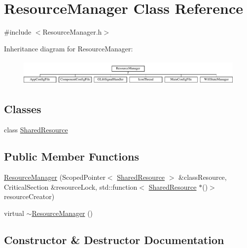 \hypertarget{classResourceManager}{}\section{Resource\+Manager Class Reference}
\label{classResourceManager}


{\ttfamily \#include $<$Resource\+Manager.\+h$>$}

Inheritance diagram for Resource\+Manager\+:\begin{figure}[H]
\begin{center}
\leavevmode
\includegraphics[height=1.323877cm]{classResourceManager}
\end{center}
\end{figure}
\subsection*{Classes}
\begin{DoxyCompactItemize}
\item 
class \mbox{\hyperlink{classResourceManager_1_1SharedResource}{Shared\+Resource}}
\end{DoxyCompactItemize}
\subsection*{Public Member Functions}
\begin{DoxyCompactItemize}
\item 
\mbox{\hyperlink{classResourceManager_aa25aef3447a267a7709609cbf59e3446}{Resource\+Manager}} (Scoped\+Pointer$<$ \mbox{\hyperlink{classResourceManager_1_1SharedResource}{Shared\+Resource}} $>$ \&class\+Resource, Critical\+Section \&resource\+Lock, std\+::function$<$ \mbox{\hyperlink{classResourceManager_1_1SharedResource}{Shared\+Resource}} $\ast$()$>$ resource\+Creator)
\item 
virtual \mbox{\hyperlink{classResourceManager_a671c186e4630599e7e36d000c53eaf80}{$\sim$\+Resource\+Manager}} ()
\end{DoxyCompactItemize}


\subsection{Constructor \& Destructor Documentation}
\mbox{\label{classResourceManager_aa25aef3447a267a7709609cbf59e3446}} 
